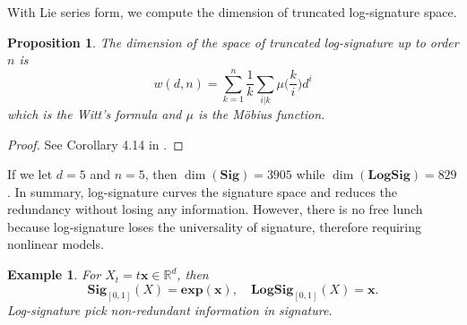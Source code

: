 \documentclass[12pt]{report}
\newtheorem{example}[theorem]{Example}
\newtheorem{proposition}[theorem]{Proposition}
\theoremstyle{definition}
\theoremstyle{remark}
\newcommand{\R}{\mathbb{R}}
\begin{document}
With Lie series form, we compute the dimension of truncated log-signature space. 
\begin{proposition}\label{logsignatureorder}
  The dimension of the space of truncated log-signature up to order $n$ is 
  \begin{equation}
    w(d,n) = \sum_{k=1}^{n}\frac{1}{k}\sum_{i|k}\mu\Big(\frac{k}{i}\Big)d^{i}
  \end{equation}
  which is the Witt's formula and $\mu$ is the M\"{o}bius function.
\end{proposition}
\begin{proof}
  See Corollary 4.14 in \cite{reutenauer2003free}.
\end{proof}
If we let $d=5$ and $n=5$, then $\dim(\mathbf{Sig}) = 3905$ while $\dim(\mathbf{LogSig}) = 829$. In summary, log-signature curves the signature space and reduces the redundancy without losing any information. However, there is no free lunch because log-signature loses the universality of signature, therefore requiring nonlinear models.  
\begin{example}
  For $X_{t} = t\mathbf{x} \in \R^{d}$, then 
  \begin{equation}
    \mathbf{Sig}_{[0,1]}(X) = \mathbf{exp}(\mathbf{x}),\quad \mathbf{LogSig}_{[0,1]}(X) = \mathbf{x}.
  \end{equation}
  Log-signature pick non-redundant information in signature.  
\end{example}
\end{document}
